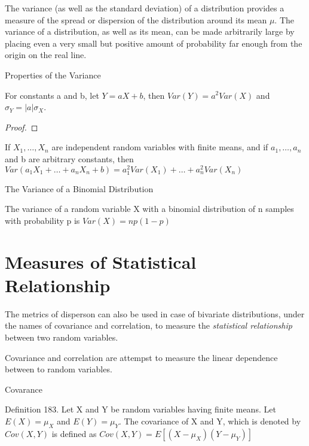 {\color{red} The variance (as well as the standard deviation) of a distribution provides a measure of the spread or dispersion of the distribution around its mean $\mu$. The variance of a distribution, as well as its mean, can be made arbitrarily large by placing even a very small but positive amount of probability far enough from the origin on the real line.}

Properties of the Variance

\begin{proposition}
For constants a and b, let $Y=aX+b$, then $Var\left(Y\right)=a^{2}Var\left(X\right)$
and $\sigma_{Y}=\left|a\right|\sigma_{X}$.
\end{proposition}
\begin{proof}
\end{proof}

{\color{red} If $X_{\text{1}},\ldots,X_{n}$ are independent random variables with finite means, and if $a_{1},\ldots,a_{n}$ and b are arbitrary constants, then $Var\left(a_{1}X_{1}+\ldots+a_{n}X_{n}+b\right)=a_{1}^{2}Var\left(X_{1}\right)+\ldots+a_{n}^{2}Var\left(X_{n}\right)$}

\begin{example}
The Variance of a Binomial Distribution

The variance of a random variable X with a binomial distribution of n samples with probability p is $Var\left(X\right)=np\left(1-p\right)$
\end{example}


%
%

\section{Measures of Statistical Relationship}
\label{sec:measures_statistical_relationship}

The metrics of disperson can also be used in case of bivariate distributions, under the names of covariance and correlation, to measure the \emph{statistical relationship} between two random variables.

Covariance and correlation are attempst to measure the linear dependence between to random variables.

Covarance

\begin{definition}
Definition 183. Let X and Y be random variables having finite means. Let $E\left(X\right)=\mu_{X}$ and $E\left(Y\right)=\mu_{Y}$. The covariance of X and Y, which is denoted by $Cov\left(X,Y\right)$ is defined as $Cov\left(X,Y\right)=E\left[\left(X-\mu_{X}\right)\left(Y-\mu_{Y}\right)\right]$
\end{definition}

